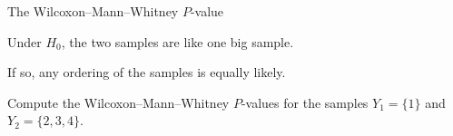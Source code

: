 \begin{frame}{The Wilcoxon--Mann--Whitney $P$-value}

  Under $H_0$, the two samples are like one big sample.

  \vspace{2em}

  If so, any ordering of the samples is equally likely.

  \vspace{2em}

   Compute the Wilcoxon--Mann--Whitney $P$-values 
  for the samples $Y_1 = \{1 \}$ and $Y_2 = \{ 2, 3, 4\}$.


\end{frame}


